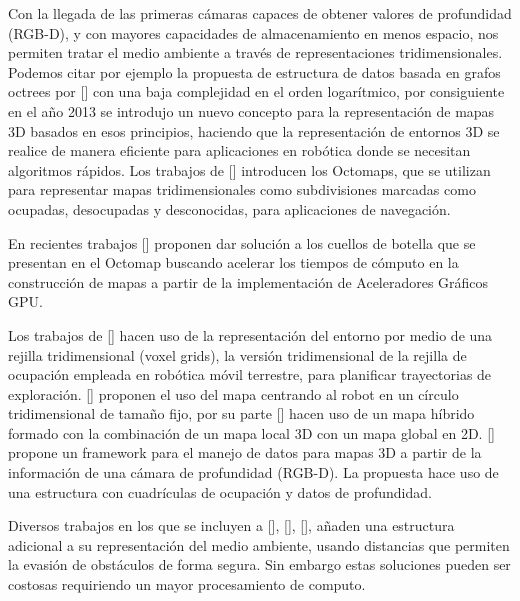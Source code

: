 Con la llegada de las primeras c\'{a}maras capaces de obtener valores de profundidad (RGB-D), y con mayores capacidades de almacenamiento en menos espacio, nos permiten tratar el medio ambiente a través de representaciones tridimensionales. Podemos citar por ejemplo la propuesta de estructura de datos basada en grafos octrees por \citeauthor{DONALD1982}[] con una baja complejidad en el orden logarítmico, por consiguiente en el año 2013 se introdujo un nuevo concepto para la representaci\'{o}n de mapas 3D basados en esos principios, haciendo que la representaci\'{o}n de entornos 3D se realice de manera eficiente para aplicaciones en rob\'{o}tica donde se necesitan algoritmos r\'{a}pidos. Los trabajos de \citeauthor{ARMIN2013}[] introducen los Octomaps, que se utilizan para representar mapas tridimensionales como subdivisiones marcadas como ocupadas, desocupadas y desconocidas, para aplicaciones de navegaci\'{o}n.

En recientes trabajos \citeauthor{min2020accelerating}[] proponen dar soluci\'{o}n a los cuellos de botella que se presentan en el Octomap buscando acelerar los tiempos de cómputo en la construcci\'{o}n de mapas a partir de la implementaci\'{o}n de Aceleradores Gr\'{a}ficos GPU.

Los trabajos de \citeauthor{CIESLEWSKI2017}[] hacen uso de la representaci\'{o}n del entorno por medio de una rejilla tridimensional (voxel grids), la versión tridimensional de la rejilla de ocupación empleada en robótica móvil terrestre, para planificar trayectorias de exploraci\'{o}n. \citeauthor{USENKO2017}[] proponen el uso del mapa centrando al robot en un círculo tridimensional de tama\~{n}o fijo, por su parte \citeauthor{MOHTA2017}[] hacen uso de un mapa h\'{i}brido formado con la combinaci\'{o}n de un mapa local 3D con un mapa global en 2D. \citeauthor{FLORENCE2018}[] propone un framework para el manejo de datos para mapas 3D a partir de la información de una cámara de profundidad (RGB-D). La propuesta hace uso de una estructura con cuadrículas de ocupación y datos de profundidad.

Diversos trabajos en los que se incluyen a \citeauthor{GAO2018}[], \citeauthor{LIN2017}[], \cite{OLEYNIKOVA2018}[], añaden una estructura adicional a su representación del medio ambiente, usando distancias que permiten la evasión de obstáculos de forma segura. Sin embargo estas soluciones pueden ser costosas requiriendo un mayor procesamiento de computo.

